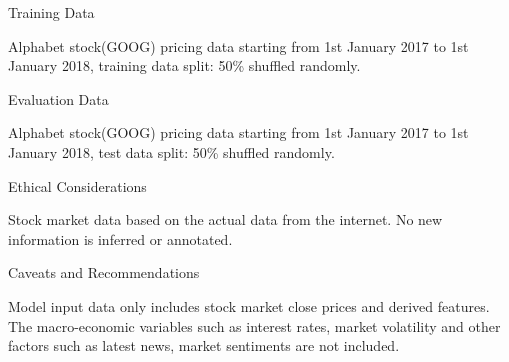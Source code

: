 \documentclass{article}
\begin{document}
\begin{adjustwidth}{-90pt}{-80pt}
\begin{singlespace}
\begin{tcolorbox}[breakable, sharp corners, boxrule=0.7pt]
{\begin{multicols}{2}
\begin{mcsection}{Training Data}
    \item Alphabet stock(GOOG) pricing data starting from 1st January 2017 to 1st January 2018, training data split: 50\% shuffled randomly.
\end{mcsection}

\begin{mcsection}{Evaluation Data}
    \item Alphabet stock(GOOG) pricing data starting from 1st January 2017 to 1st January 2018, test data split: 50\% shuffled randomly.
\end{mcsection}

\begin{mcsection}{Ethical Considerations}
    \item Stock market data based on the actual data from the internet. No new information is inferred or annotated.
\end{mcsection}

\begin{mcsection}{Caveats and Recommendations}
    \item Model input data only includes stock market close prices and derived features. The macro-economic variables such as interest rates, market volatility and other factors such as latest news, market sentiments are not included.
\end{mcsection}

\end{multicols}

}
\end{tcolorbox}
\end{singlespace}
\end{adjustwidth}
\end{document}
